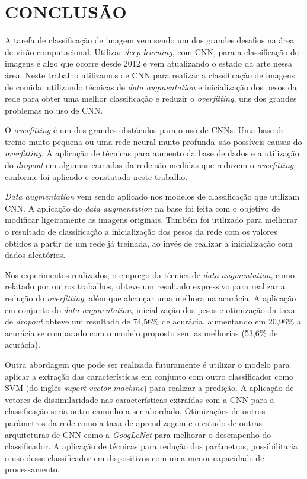 
\chapter{CONCLUSÃO}
\label{chap:conclusao}

A tarefa de classificação de imagem vem sendo um dos grandes desafios na área de visão computacional. Utilizar \textit{deep learning}, com CNN, para a classificação de imagens é algo que ocorre desde 2012 e vem atualizando o estado da arte nessa área. Neste trabalho utilizamos de CNN para realizar a classificação de imagens de comida, utilizando técnicas de \textit{data augmentation} e inicialização dos pesos da rede para obter uma melhor classificação e reduzir o \textit{overfitting}, uns dos grandes problemas no uso de CNN.
\par O \textit{overfitting} é um dos grandes obstáculos para o uso de CNNs. Uma base de treino muito pequena ou uma rede neural muito profunda~são possíveis causas do \textit{overfitting}. A aplicação de técnicas para aumento da base de dados e a utilização do \textit{dropout} em algumas camadas da rede são medidas que reduzem o \textit{overfitting}, conforme foi aplicado e constatado neste trabalho.
\par \textit{Data augmentation} vem sendo aplicado nos modelos de classificação que utilizam CNN. A aplicação do \textit{data augmentation} na base foi feita com o objetivo de modificar ligeiramente as imagens originais. Também foi utilizado para melhorar o resultado de classificação a inicialização dos pesos da rede com os valores obtidos a partir de um rede já treinada, ao invés de realizar a inicialização com dados aleatórios.   
\par Nos experimentos realizados, o emprego da técnica de \textit{data augmentation}, como relatado por outros trabalhos, obteve um resultado expressivo para realizar a redução do \textit{overfitting}, além que alcançar uma melhora na acurácia. A aplicação em conjunto do \textit{data augmentation}, inicialização dos pesos e otimização da taxa de \textit{dropout} obteve um resultado de 74,56\% de acurácia, aumentando em 20,96\% a acurácia se comparado com o modelo proposto sem as melhorias (53,6\% de acurácia).
\par Outra abordagem que pode ser realizada futuramente é utilizar o modelo para aplicar a extração das características em conjunto com outro classificador como SVM (do inglês \textit{suport vector machine}) para realizar a predição. A aplicação de vetores de dissimilaridade nas características extraídas com a CNN para a classificação seria outro caminho a ser abordado. Otimizações de outros parâmetros da rede como a taxa de aprendizagem e o estudo de outras arquiteturas de CNN como a \textit{GoogLeNet} \cite{szegedy2015going} para melhorar o desempenho do classificador. A aplicação de técnicas para redução dos parâmetros, possibilitaria o uso desse classificador em dispositivos com uma menor capacidade de processamento.
